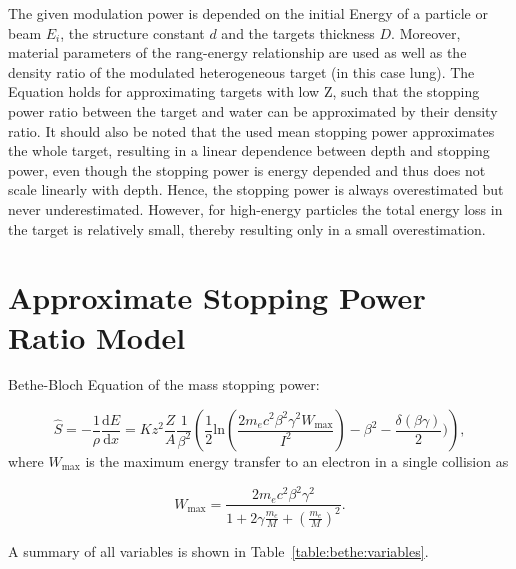 \documentclass{article}
\begin{document}
The given modulation power is depended on the initial Energy of a particle or beam $E_i$, the structure constant $d$ and the targets thickness $D$. 
Moreover, material parameters of the rang-energy relationship are used as well as the density ratio of the modulated heterogeneous target (in this case lung).
The Equation holds for approximating targets with low Z, such that the stopping power ratio between the target and water can be approximated by their density ratio.
It should also be noted that the used mean stopping power approximates the whole target, resulting in a linear dependence between depth and stopping power, even though the stopping power is energy depended and thus does not scale linearly with depth.
Hence, the stopping power is always overestimated but never underestimated. 
However, for high-energy particles the total energy loss in the target is relatively small, thereby resulting only in a small overestimation. 

\pagebreak

\section{Approximate Stopping Power Ratio Model}
Bethe-Bloch Equation of the mass stopping power:

\begin{equation}
    \hat{S} = -\frac{1}{\rho}\frac{\text{d}E}{\text{d}x} = Kz^2\frac{Z}{A}\frac{1}{\beta^2}\left(\frac{1}{2}\text{ln}\left(\frac{2m_ec^2\beta^2\gamma^2W_{\text{max}}}{I^2}\right)-\beta^2-\frac{\delta(\beta\gamma)}{2}) \right),
\end{equation}
where $W_{\text{max}}$ is the maximum energy transfer to an electron in a single collision as

\begin{equation}
    W_{\text{max}} = \frac{2m_e c^2\beta^2\gamma^2}{1+2\gamma \frac{m_e}{M}+(\frac{m_e}{{M}})^2}.
\end{equation}

A summary of all variables is shown in Table~\ref{table:bethe:variables}.
\end{document}
